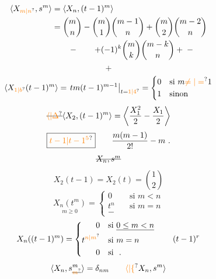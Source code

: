 \[
\begin{aligned}
\langle X_{\unsure{m|n}},s^m\rangle&=\langle X_n,(t-1)^m\rangle\\
&=\binom mn-\binom m1\binom{m-1}n+\binom m2\binom{m-2}n\\
&\qquad-\qquad+(-1)^k\binom mk\binom{m-k}n+\;-
\end{aligned}
\]
\[+\]
\[
\langle X_{\unsure{1|b}}(t-1)^m\rangle=\left.tm(t-1)^{m-1}\right|_{t=\unsure{1|4}}
=\left\{\begin{aligned}
0&\quad\text{si }m\unsure{\ne|=}1\\
1&\quad\text{sinon}
\end{aligned}\right.
\]
\[
\deleted{\unsure{\langle|\Delta}}\langle X_2,(t-1)^m\rangle=\left\langle\frac{X_1^2}{2}-\frac{X_1}{2}\right\rangle
\]
\[\boxed{\unsure{t-1|t-1^5}}\qquad\frac{m(m-1)}{2!}-m\ .\]
\[\deleted{X_n,s^m}\]
\[X_2(t-1)=X_2(t)=\binom12\]
\[
\underset{m\geq0}{X_n(t^m)}=\left\{\begin{aligned}
0&\quad\text{si }m<n\\
t^n&\quad\text{si }m=n\\
-&
\end{aligned}\right.
\]
\[
X_n((t-1)^m)=\left\{\begin{aligned}
0&\quad\text{si }\underline{0\leq m<n}\\
t^{\unsure{n|m}}&\quad\text{si }m=n\\
0&\quad\text{si }\ .
\end{aligned}\right.
\qquad(t-1)^r
\]
\[\langle X_n,s_{\deleted{\unsure{m}}}^{m}\rangle=\delta_{nm}\qquad\unsure{\langle|\{}X_n,s^m\rangle\]
